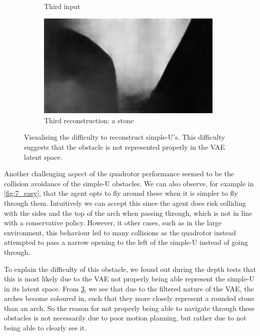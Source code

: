 \begin{figure}[H]
\begin{subfigure}[b]{0.49\textwidth}
        \caption{Third input}
        \label{fig:66_0_a_pre_image}
    \end{subfigure} 
    \hfill
    \begin{subfigure}[b]{0.49\textwidth}
        \centering
        \captionsetup{justification=centering}
        \includegraphics[width=0.98\textwidth]{figures/9_/66_0_c_vae_image.png}
        \caption{Third reconstruction: a stone}
        \label{fig:66_0_c_vae_image}
    \end{subfigure}
    \caption{Visualising the difficulty to reconstruct simple-U's. This difficulty suggests that the obstacle is not represented properly in the VAE latent space.}
    \label{fig:9_noisy_simple_u}
\end{figure}
Another challenging aspect of the quadrotor performance seemed to be the collision avoidance of the simple-U obstacles. We can also observe, for example in \cref{fig:7_easy}, that the agent opts to fly around these when it is simpler to fly through them. Intuitively we can accept this since the agent does risk colliding with the sides and the top of the arch when passing through, which is not in line with a conservative policy. However, it other cases, such as in the large environment, this behaviour led to many collisions as the quadrotor instead attempted to pass a narrow opening to the left of the simple-U instead of going through. 

To explain the difficulty of this obstacle, we found out during the depth tests that this is most likely due to the VAE not properly being able represent the simple-U in its latent space. From \cref{fig:9_noisy_simple_u}, we see that due to the filtered nature of the VAE, the arches become coloured in, such that they more closely represent a rounded stone than an arch. So the reason for not properly being able to navigate through these obstacles is not necessarily due to poor motion planning, but rather due to not being able to clearly see it.



